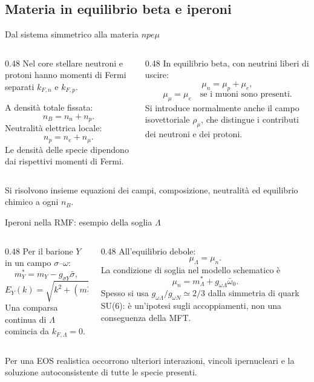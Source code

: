 \subsection{Materia in equilibrio beta e iperoni}

\begin{frame}{Dal sistema simmetrico alla materia $npe\mu$}
\small
\begin{columns}[T,onlytextwidth]
\begin{column}{0.48\textwidth}
Nel core stellare neutroni e protoni hanno momenti di Fermi separati $k_{F,n}$ e $k_{F,p}$.

A densità totale fissata:
\[
 n_B=n_n+n_p.
\]
Neutralità elettrica locale:
\[
 n_p=n_e+n_\mu.
\]
Le densità delle specie dipendono dai rispettivi momenti di Fermi.
\end{column}
\begin{column}{0.48\textwidth}
In equilibrio beta, con neutrini liberi di uscire:
\[
 \mu_n=\mu_p+\mu_e,
\]
\[
 \mu_\mu=\mu_e
 \quad\text{se i muoni sono presenti}.
\]
Si introduce normalmente anche il campo isovettoriale $\rho_\mu$, che distingue i contributi dei neutroni e dei protoni.
\end{column}
\end{columns}
\medskip
Si risolvono insieme equazioni dei campi, composizione, neutralità ed equilibrio chimico a ogni $n_B$.
\end{frame}

\begin{frame}{Iperoni nella RMF: esempio della soglia $\Lambda$}
\small
\begin{columns}[T,onlytextwidth]
\begin{column}{0.48\textwidth}
Per il barione $Y$ in un campo $\sigma$--$\omega$:
\[
 m_Y^*=m_Y-g_{\sigma Y}\bar\sigma,
\]
\[
 E_Y(k)=\sqrt{k^2+(m_Y^*)^2}
 +g_{\omega Y}\bar\omega_0.
\]
Una comparsa continua di $\Lambda$ comincia da $k_{F,\Lambda}=0$.
\end{column}
\begin{column}{0.48\textwidth}
All'equilibrio debole:
\[
 \mu_\Lambda=\mu_n.
\]
La condizione di soglia nel modello schematico è
\[
 \mu_n=m_\Lambda^*+g_{\omega\Lambda}\bar\omega_0.
\]
Spesso si usa $g_{\omega\Lambda}/g_{\omega N}\simeq2/3$ dalla simmetria di quark SU(6): è un'ipotesi sugli accoppiamenti, non una conseguenza della MFT.
\end{column}
\end{columns}
\medskip
Per una EOS realistica occorrono ulteriori interazioni, vincoli ipernucleari e la soluzione autoconsistente di tutte le specie presenti.
\end{frame}

